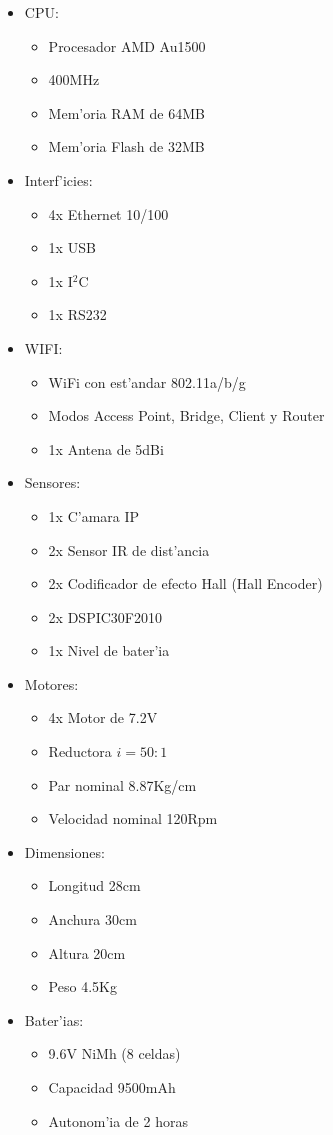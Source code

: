 \documentclass[twoside,12pt]{article}
\begin{document}
\begin{multicols}{2}
\begin{itemize}
\item CPU:
	\begin{itemize}
	\item Procesador AMD Au1500
	\item 400MHz
	\item Mem'oria RAM de 64MB
	\item Mem'oria Flash de 32MB
	\end{itemize}
\item Interf'icies:
	\begin{itemize}
	\item 4x Ethernet 10/100
	\item 1x USB
	\item 1x I$^{2}$C %
	\item 1x RS232
	\end{itemize}
\item WIFI:
	\begin{itemize}
	\item WiFi con est'andar 802.11a/b/g
	\item Modos Access Point, Bridge, Client y Router
	\item 1x Antena de 5dBi
	\end{itemize}
\item Sensores:
	\begin{itemize}
	\item 1x C'amara IP
	\item 2x Sensor IR de dist'ancia
	\item 2x Codificador de efecto Hall (Hall Encoder) 
	\item 2x DSPIC30F2010
	\item 1x Nivel de bater'ia
	\end{itemize}
\item Motores:
	\begin{itemize}
	\item 4x Motor de 7.2V
	\item Reductora $i=50:1$
	\item Par nominal 8.87Kg/cm
	\item Velocidad nominal 120Rpm
	\end{itemize}
\item Dimensiones:
	\begin{itemize}
	\item Longitud 28cm
	\item Anchura 30cm
	\item Altura 20cm
	\item Peso 4.5Kg
	\end{itemize}
\item Bater'ias:
	\begin{itemize}
	\item 9.6V NiMh (8 celdas)
	\item Capacidad 9500mAh
	\item Autonom'ia de 2 horas
	\end{itemize}
\end{itemize}
\end{multicols}
\end{document}
